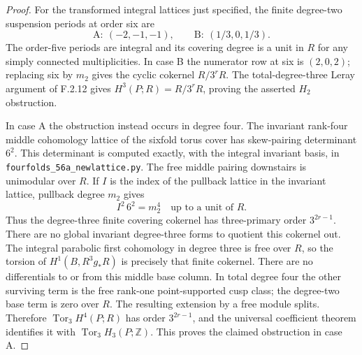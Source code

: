\begin{proof}
For the transformed integral lattices just specified, the
finite degree-two suspension periods at order six are
\[
 \mathrm A:\ (-2,-1,-1),\qquad
 \mathrm B:\ (1/3,0,1/3).
 \tag{F.37}
\]
The order-five periods are integral and its covering degree
is a unit in $R$ for any simply connected multiplicities.
In case B the numerator row at six is $(2,0,2)$; replacing
six by $m_2$ gives the cyclic cokernel $R/3^rR$.
The total-degree-three Leray argument of F.2.12 gives
$H^3(P;R)=R/3^rR$, proving the asserted $H_2$ obstruction.

In case A the obstruction instead occurs in degree four.
The invariant rank-four middle cohomology lattice of the
sixfold torus cover has skew-pairing determinant $6^2$.
This determinant is computed exactly, with the integral
invariant basis, in \texttt{fourfolds\_56a\_newlattice.py}.
The free middle pairing downstairs is unimodular over $R$.
If $I$ is the index of the pullback lattice in the invariant
lattice, pullback degree $m_2$ gives
\[
 I^2\,6^2=m_2^4
 \quad\text{up to a unit of }R.
 \tag{F.38}
\]
Thus the degree-three finite covering cokernel has
three-primary order $3^{2r-1}$.
There are no global invariant degree-three forms to
quotient this cokernel out.  The integral parabolic first
cohomology in degree three is free over $R$, so the torsion
of $H^1(B,R^3g_*R)$ is precisely that finite cokernel.
There are no differentials to or from this middle base
column.  In total degree four the other surviving term
is the free rank-one point-supported cusp class;
the degree-two base term is zero over $R$.
The resulting extension by a free module splits.
Therefore $\operatorname{Tor}_3H^4(P;R)$ has order
$3^{2r-1}$, and the universal coefficient theorem identifies
it with $\operatorname{Tor}_3H_3(P;\mathbb Z)$.
This proves the claimed obstruction in case A.
\end{proof}
